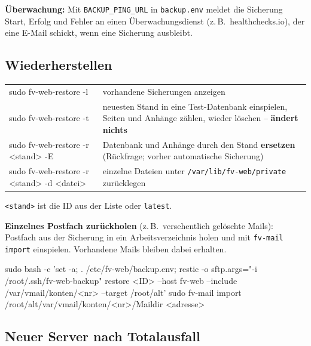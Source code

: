\documentclass[a4paper,fontsize=10pt]{scrartcl}
\newcommand*{\cmd}[1]{\texttt{#1}}
\newcommand*{\pfad}[1]{\texttt{#1}}
\begin{document}
\textbf{Überwachung:} Mit \cmd{BACKUP\_PING\_URL} in \pfad{backup.env} meldet die
Sicherung Start, Erfolg und Fehler an einen Überwachungsdienst (z.\,B.\
healthchecks.io), der eine E-Mail schickt, wenn eine Sicherung ausbleibt.

\subsection{Wiederherstellen}

\begin{center}
\small
\begin{tabularx}{\textwidth}{@{}>{\ttfamily\raggedright}p{60mm}X@{}}
\toprule
sudo fv-web-restore -l          & vorhandene Sicherungen anzeigen \\
sudo fv-web-restore -t          & neuesten Stand in eine Test-Datenbank einspielen, Seiten und
                                  Anhänge zählen, wieder löschen -- \textbf{ändert nichts} \\
sudo fv-web-restore -r <stand> -E & Datenbank und Anhänge durch den Stand \textbf{ersetzen}
                                  (Rückfrage; vorher automatische Sicherung) \\
sudo fv-web-restore -r <stand> -d <datei> & einzelne Dateien unter \pfad{/var/lib/fv-web/private}
                                  zurücklegen \\
\bottomrule
\end{tabularx}
\end{center}

\cmd{<stand>} ist die ID aus der Liste oder \cmd{latest}.

\textbf{Einzelnes Postfach zurückholen} (z.\,B.\ versehentlich gelöschte Mails):
Postfach aus der Sicherung in ein Arbeitsverzeichnis holen und mit \cmd{fv-mail
import} einspielen. Vorhandene Mails bleiben dabei erhalten.

\begin{befehl}
sudo bash -c 'set -a; . /etc/fv-web/backup.env; restic -o sftp.args="-i /root/.ssh/fv-web-backup" restore <ID> --host fv-web --include /var/vmail/konten/<nr> --target /root/alt'
sudo fv-mail import /root/alt/var/vmail/konten/<nr>/Maildir <adresse>
\end{befehl}

\subsection{Neuer Server nach Totalausfall}
\end{document}
